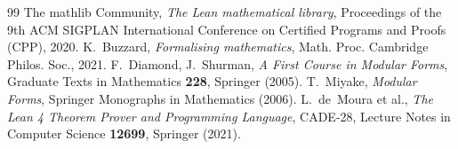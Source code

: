 \documentclass[11pt, a4paper]{article}
\theoremstyle{remark}
\begin{document}
\begin{thebibliography}{99}
 The mathlib Community, \textit{The Lean mathematical library}, Proceedings of the 9th ACM SIGPLAN International Conference on Certified Programs and Proofs (CPP), 2020.
 K.~Buzzard, \textit{Formalising mathematics}, Math. Proc. Cambridge Philos. Soc., 2021.
 F.~Diamond, J.~Shurman, \textit{A First Course in Modular Forms}, Graduate Texts in Mathematics \textbf{228}, Springer (2005).
 T.~Miyake, \textit{Modular Forms}, Springer Monographs in Mathematics (2006).
 L.~de~Moura et al., \textit{The Lean 4 Theorem Prover and Programming Language}, CADE-28, Lecture Notes in Computer Science \textbf{12699}, Springer (2021).
\end{thebibliography}
\end{document}

